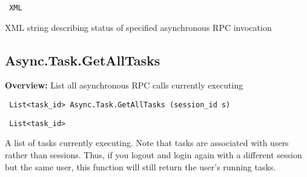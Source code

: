\vspace{0.3cm}

{\tt 
XML
}


XML string describing status of specified asynchronous RPC invocation
\vspace{0.3cm}
\vspace{0.3cm}
\vspace{0.3cm}

\subsection{Async.Task.GetAllTasks}

{\bf Overview:} 
List all asynchronous RPC calls currently executing

\begin{verbatim} List<task_id> Async.Task.GetAllTasks (session_id s)\end{verbatim}


\vspace{0.3cm}

{\tt 
List<task\_id>
}


A list of tasks currently executing. Note that
tasks are associated with users rather than sessions. Thus, if you logout and
login again with a different session but the same user, this function will still
return the user's running tasks.
\vspace{0.3cm}
\vspace{0.3cm}
\vspace{0.3cm}



